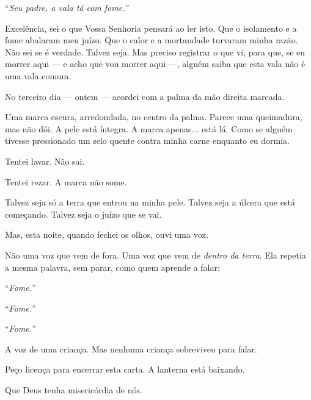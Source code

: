 \noindent \textquotedblleft{\textit{Seu padre, a vala tá com fome.\textquotedblright{}}}

\noindent Excelência, sei o que Vossa Senhoria pensará ao ler isto. Que o isolamento e a fome abalaram meu juízo. Que o calor e a mortandade turvaram minha razão. Não sei se é verdade. Talvez seja. Mas preciso registrar o que vi, para que, se eu morrer aqui — e acho que vou morrer aqui —, alguém saiba que esta vala não é uma vala comum.

\noindent No terceiro dia — ontem — acordei com a palma da mão direita marcada.

\noindent Uma marca escura, arredondada, no centro da palma. Parece uma queimadura, mas não dói. A pele está íntegra. A marca apenas... está lá. Como se alguém tivesse pressionado um selo quente contra minha carne enquanto eu dormia.

\noindent Tentei lavar. Não sai.

\noindent Tentei rezar. A marca não some.

\noindent Talvez seja só a terra que entrou na minha pele. Talvez seja a úlcera que está começando. Talvez seja o juízo que se vai.

\noindent Mas, esta noite, quando fechei os olhos, ouvi uma voz.

\noindent Não uma voz que vem de fora. Uma voz que vem de \textit{dentro da terra}. Ela repetia a mesma palavra, sem parar, como quem aprende a falar:

\noindent \textquotedblleft{\textit{Fome.\textquotedblright{}}}

\noindent \textquotedblleft{\textit{Fome.\textquotedblright{}}}

\noindent \textquotedblleft{\textit{Fome.\textquotedblright{}}}

\noindent A voz de uma criança. Mas nenhuma criança sobreviveu para falar.

\noindent Peço licença para encerrar esta carta. A lanterna está baixando.

\noindent Que Deus tenha misericórdia de nós.

